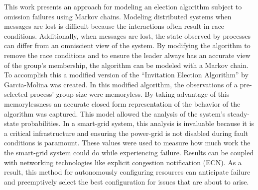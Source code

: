 This work presents an approach for modeling an election algorithm subject to omission failures using Markov chains.
Modeling distributed systems when messages are lost is difficult because the interactions often result in race conditions.
Additionally, when messages are lost, the state observed by processes can differ from an omniscient view of the system.
By modifying the algorithm to remove the race conditions and to ensure the leader always has an accurate view of the group's membership, the algorithm can be modeled with a Markov chain.
To accomplish this a modified version of the ``Invitation Election Algorithm'' by Garcia-Molina was created.
In this modified algorithm, the observations of a pre-selected process' group size were memoryless.
By taking advantage of this memorylessness an accurate closed form representation of the behavior of the algorithm was captured.
This model allowed the analysis of the system's steady-state probabilities.
In a smart-grid system, this analysis is invaluable because it is a critical infrastructure and ensuring the power-grid is not disabled during fault conditions is paramount.
These values were used to measure how much work the the smart-grid system could do while experiencing failure.
Results can be coupled with networking technologies like explicit congestion notification (ECN).
As a result, this method for autonomously configuring resources can anticipate failure and preemptively select the best configuration for issues that are about to arise.


